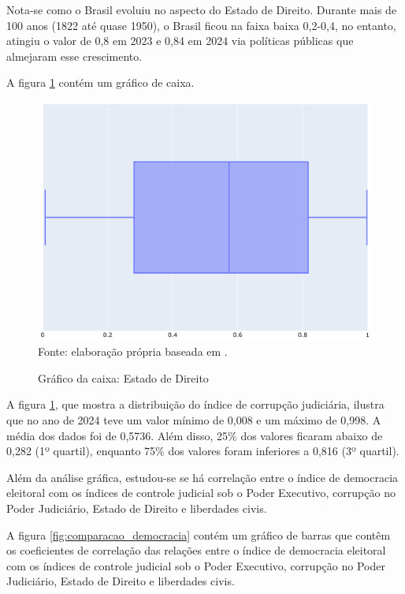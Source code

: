 Nota-se como o Brasil evoluiu no aspecto do Estado de Direito. Durante mais de 100 anos (1822 até quase 1950), o Brasil ficou na faixa baixa 0,2-0,4, no entanto, atingiu o valor de 0,8 em 2023 e 0,84 em 2024 via políticas públicas que almejaram esse crescimento.

A figura \ref{fig:quartis_estado_direito} contém um gráfico de caixa.

\begin{figure}[H]
	\centering
	\caption{Gráfico da caixa: Estado de Direito}
	\includegraphics[width=1\linewidth]{figuras/quartis_estado_direito}
	\label{fig:quartis_estado_direito}
	\footnotesize{Fonte: elaboração própria baseada em \cite{rule-of-law-index}.}
\end{figure}

A figura \ref{fig:quartis_estado_direito}, que mostra a distribuição do índice de corrupção judiciária, ilustra que no ano de 2024 teve um valor mínimo de 0,008 e um máximo de 0,998. A média dos dados foi de 0,5736. Além disso, 25\% dos valores ficaram abaixo de 0,282 (1º quartil), enquanto 75\% dos valores foram inferiores a 0,816 (3º quartil).

Além da análise gráfica, estudou-se se há correlação entre o índice de democracia eleitoral com os índices de controle judicial sob o Poder Executivo, corrupção no Poder Judiciário, Estado de Direito e liberdades civis.

A figura \ref{fig:comparacao_democracia} contém um gráfico de barras que contêm os coeficientes de correlação das relações entre o índice de democracia eleitoral com os índices de controle judicial sob o Poder Executivo, corrupção no Poder Judiciário, Estado de Direito e liberdades civis.

